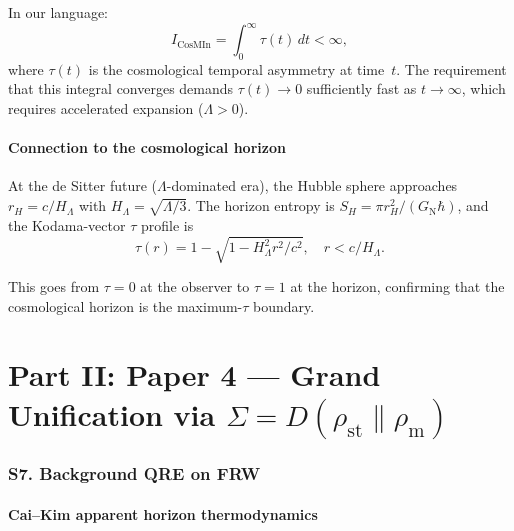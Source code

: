 \documentclass[aps,prd,preprint,superscriptaddress,longbibliography]{revtex4-2}
\newcommand{\KL}{D}
\newcommand{\tauasym}{\tau}
\newcommand{\GN}{G_{\mathrm{N}}}
\begin{document}
In our language:
\begin{equation}
I_{\mathrm{CosMIn}} = \int_0^{\infty} \tauasym(t)\,dt < \infty,
\label{eq:cosmin_tau}
\end{equation}
where $\tauasym(t)$ is the cosmological temporal asymmetry at time~$t$.
The requirement that this integral converges demands
$\tauasym(t) \to 0$ sufficiently fast as $t\to\infty$, which requires
accelerated expansion ($\Lambda > 0$).

\subsection{Connection to the cosmological horizon}

At the de Sitter future ($\Lambda$-dominated era), the Hubble sphere
approaches $r_H = c/H_{\Lambda}$ with
$H_{\Lambda} = \sqrt{\Lambda/3}$.  The horizon entropy is
$S_H = \pi r_H^2 / (\GN\hbar)$, and the Kodama-vector $\tauasym$
profile is
\begin{equation}
\tauasym(r) = 1 - \sqrt{1 - H_\Lambda^2 r^2/c^2},
\quad r < c/H_\Lambda.
\label{eq:tau_dS}
\end{equation}

This goes from $\tauasym = 0$ at the observer to $\tauasym = 1$ at
the horizon, confirming that the cosmological horizon is the
maximum-$\tauasym$ boundary.


\part*{Part II: Paper 4 --- Grand Unification via
$\Sigma = \KL(\rho_{\mathrm{st}}\|\rho_{\mathrm{m}})$}

\section{S7. Background QRE on FRW}
\label{sec:FRW_background}

\subsection{Cai--Kim apparent horizon thermodynamics}
\end{document}
